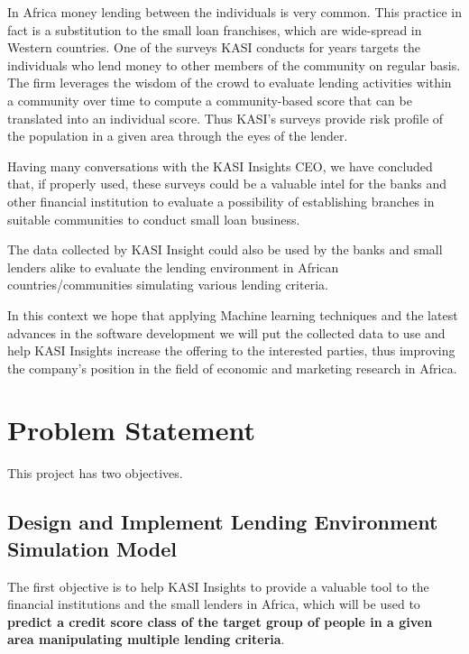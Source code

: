 In Africa money lending between the individuals is very common. This
practice in fact is a substitution to the small loan franchises, which
are wide-spread in Western countries. One of the surveys KASI conducts
for years targets the individuals who lend money to other members of the
community on regular basis. The firm leverages the wisdom of the crowd
to evaluate lending activities within a community over time to compute a
community-based score that can be translated into an individual score.
Thus KASI's surveys provide risk profile of the population in a given
area through the eyes of the lender.

Having many conversations with the KASI Insights CEO, we have concluded
that, if properly used, these surveys could be a valuable intel for the
banks and other financial institution to evaluate a possibility of
establishing branches in suitable communities to conduct small loan
business.

The data collected by KASI Insight could also be used by the banks and
small lenders alike to evaluate the lending environment in African
countries/communities simulating various lending criteria.

In this context we hope that applying Machine learning techniques and
the latest advances in the software development we will put the
collected data to use and help KASI Insights increase the offering to
the interested parties, thus improving the company's position in the
field of economic and marketing research in Africa.

\hypertarget{problem-statement}{%
\section{Problem Statement}\label{problem-statement}}

This project has two objectives.

\hypertarget{design-and-implement-lending-environment-simulation-model}{%
\subsection{Design and Implement Lending Environment Simulation
Model}\label{design-and-implement-lending-environment-simulation-model}}

The first objective is to help KASI Insights to provide a valuable tool
to the financial institutions and the small lenders in Africa, which
will be used to \textbf{predict a credit score class of the target group
of people in a given area manipulating multiple lending criteria}.

